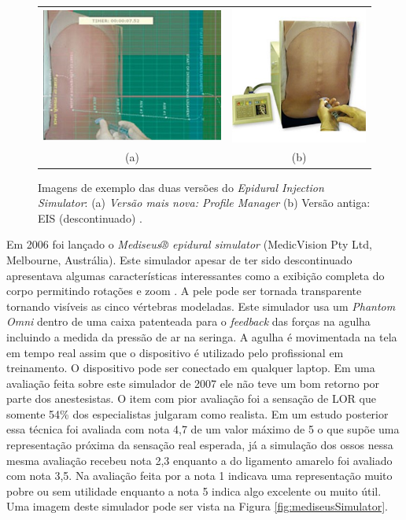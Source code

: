 \begin{figure}[ht!]
    \centering
        \begin{tabular}{cc}
        \includegraphics[width=0.4\linewidth]{capitulos/figuras/epiduralInjectionSimulatorPM.jpg} & 
        \includegraphics[width=0.3\linewidth]{capitulos/figuras/epiduralInjectionSimulator.jpg} 
        \\
        (a) & (b)
        \end{tabular}
    \caption{Imagens de exemplo das duas versões do \textit{Epidural Injection Simulator}: (a) \textit{Versão mais nova: Profile Manager} (b) Versão antiga: EIS (descontinuado)  \cite{CPRSavers&FirstAidSupply2018}.}
    \label{fig:EpiduralInjectionSimulator}
\end{figure}

Em 2006 foi lançado o \textit{Mediseus® epidural simulator} (MedicVision Pty Ltd, Melbourne, Austrália). Este simulador apesar de ter sido descontinuado apresentava algumas características interessantes como a exibição completa do corpo permitindo rotações e zoom \cite{Mayooran2006}. A pele pode ser tornada transparente tornando visíveis as cinco vértebras modeladas. Este simulador usa um \textit{Phantom Omni} dentro de uma caixa patenteada \cite{Brien2007} para o \textit{feedback} das forças na agulha incluindo a medida da pressão de ar na seringa. A agulha é movimentada na tela em tempo real assim que o dispositivo é utilizado pelo profissional em treinamento. O dispositivo pode ser conectado em qualquer laptop. Em uma avaliação feita sobre este simulador de 2007 \cite{Elks2007} ele não teve um bom retorno por parte dos anestesistas. O item com pior avaliação foi a sensação de LOR que somente 54\% dos especialistas julgaram como realista. Em um estudo posterior \cite{Lee2012} essa técnica foi avaliada com nota 4,7 de um valor máximo de 5 o que supõe uma representação próxima da sensação real esperada, já a simulação dos ossos nessa mesma avaliação recebeu nota 2,3 enquanto a do ligamento amarelo foi avaliado com nota 3,5. Na avaliação feita por \textcite{Lee2012} a nota 1 indicava uma representação muito pobre ou sem utilidade enquanto a nota 5 indica algo excelente ou muito útil. Uma imagem deste simulador pode ser vista na Figura \ref{fig:mediseusSimulator}.


